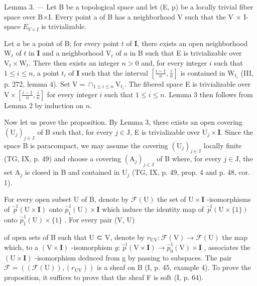 Lemma 3. --- Let B be a topological space and let (E, p) be a locally trivial fiber space over B×I. Every point a of B has a neighborhood V such that the V × I-space \(E_{V \times I}\) is trivializable.

Let \(a\) be a point of B; for every point \(t\) of \(\mathbf{I}\), there exists an open neighborhood \(\mathrm{W}_t\) of \(t\) in \(\mathbf{I}\) and a neighborhood \(\mathrm{V}_t\) of \(a\) in B such that E is trivializable over \(\mathrm{V}_t \times \mathrm{W}_t\). There then exists an integer \(n > 0\) and, for every integer \(i\) such that \(1 \leqslant i \leqslant n\), a point \(t_i\) of \(\mathbf{I}\) such that the interval \([\frac{i-1}{n}, \frac{i}{n}]\) is contained in \(\mathrm{W}_{t_i}\) (III, p. 272, lemma 4). Set \(\mathrm{V} = \cap_{1 \leqslant i \leqslant n} \mathrm{V}_{t_i}\). The fibered space E is trivializable over \(\mathrm{V} \times [\frac{i-1}{n}, \frac{i}{n}]\) for every integer \(i\) such that \(1 \leqslant i \leqslant n\). Lemma 3 then follows from Lemma 2 by induction on \(n\).

Now let us prove the proposition. By Lemma 3, there exists an open covering \((\mathrm{U}_j)_{j\in \mathrm{J}}\) of B such that, for every \(j\in \mathrm{J}\), E is trivializable over \(\mathrm{U}_j\times \mathbf{I}\). Since the space B is paracompact, we may assume the covering \((\mathrm{U}_j)_{j\in \mathrm{J}}\) locally finite (TG, IX, p. 49) and choose a covering \((\mathrm{A}_j)_{j\in \mathrm{J}}\) of B where, for every \(j\in \mathrm{J}\), the set \(\mathrm{A}_j\) is closed in B and contained in \(\mathrm{U}_j\) (TG, IX, p. 49, prop. 4 and p. 48, cor. 1).

For every open subset U of B, denote by \(\mathcal{F}(\mathrm{U})\) the set of \(\mathrm{U}\times\mathbf{I}\) -isomorphisms of \(\stackrel{-1}{p}(\mathrm{U}\times\mathbf{I})\) onto \(\stackrel{-1}{p_{1}}(\mathrm{U})\times\mathbf{I}\) which induce the identity map of \(\stackrel{-1}{p}(\mathrm{U}\times\{1\})\) onto \(\stackrel{-1}{p_{1}}(\mathrm{U})\times\{1\}\) . For every pair (V, U)

of open sets of B such that U ⊂ V, denote by \(r_{\mathrm{UV}} \colon \mathcal{F}(\mathrm{V}) \to \mathcal{F}(\mathrm{U})\) the map which, to a \((\mathrm{V} \times \mathbf{I})\) -isomorphism \(g \colon \stackrel{-1}{p}(\mathrm{V} \times \mathbf{I}) \to \stackrel{-1}{p_0}(\mathrm{V}) \times \mathbf{I}\) , associates the \((\mathrm{U} \times \mathbf{I})\) -isomorphism deduced from g by passing to subspaces. The pair \(\mathcal{F} = ((\mathcal{F}(\mathrm{U})), (r_{\mathrm{UV}}))\) is a sheaf on B (I, p. 45, example 4). To prove the proposition, it suffices to prove that the sheaf F is soft (I, p. 64).

